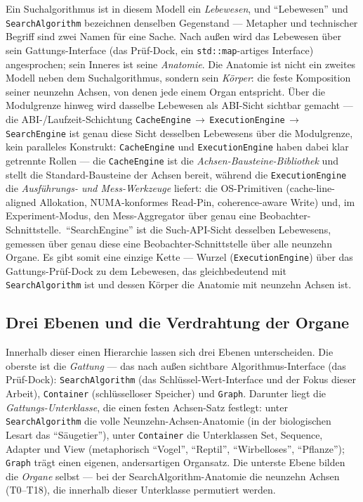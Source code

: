 Ein Suchalgorithmus ist in diesem Modell ein \emph{Lebewesen}, und \enquote{Lebewesen} und
\texttt{SearchAlgorithm} bezeichnen denselben Gegenstand --- Metapher und technischer Begriff sind
zwei Namen für eine Sache. Nach außen wird das Lebewesen über sein Gattungs-Interface (das
Prüf-Dock, ein \texttt{std::map}-artiges Interface) angesprochen; sein Inneres ist seine
\emph{Anatomie}. Die Anatomie ist nicht ein zweites Modell neben dem Suchalgorithmus, sondern sein
\emph{Körper}: die feste Komposition seiner neunzehn Achsen, von denen jede einem Organ
entspricht. Über die Modulgrenze hinweg wird dasselbe Lebewesen als ABI-Sicht sichtbar gemacht ---
die ABI-/Laufzeit-Schichtung
\texttt{CacheEngine}\,$\to$\,\texttt{ExecutionEngine}\,$\to$\,\texttt{SearchEngine} ist genau
diese Sicht desselben Lebewesens über die Modulgrenze, kein paralleles Konstrukt:
\texttt{CacheEngine} und \texttt{ExecutionEngine} haben dabei klar getrennte Rollen --- die
\texttt{CacheEngine} ist die \emph{Achsen-Bausteine-Bibliothek} und stellt die Standard-Bausteine
der Achsen bereit, während die \texttt{ExecutionEngine} die \emph{Ausführungs- und Mess-Werkzeuge}
liefert: die OS-Primitiven (cache-line-aligned Allokation, NUMA-konformes Read-Pin,
coherence-aware Write) und, im Experiment-Modus, den Mess-Aggregator über genau eine
Beobachter-Schnittstelle.\ \enquote{SearchEngine} ist die Such-API-Sicht desselben Lebewesens,
gemessen über genau diese eine Beobachter-Schnittstelle über alle neunzehn Organe. Es gibt somit
eine einzige Kette --- Wurzel (\texttt{ExecutionEngine}) über das Gattungs-Prüf-Dock zu dem
Lebewesen, das gleichbedeutend mit \texttt{SearchAlgorithm} ist und dessen Körper die Anatomie mit
neunzehn Achsen ist.

\subsection{Drei Ebenen und die Verdrahtung der Organe}\label{ssec:three-levels}

Innerhalb dieser einen Hierarchie lassen sich drei Ebenen unterscheiden. Die oberste ist die
\emph{Gattung} --- das nach außen sichtbare Algorithmus-Interface (das Prüf-Dock):
\texttt{SearchAlgorithm} (das Schlüssel-Wert-Interface und der Fokus dieser Arbeit),
\texttt{Container} (schlüsselloser Speicher) und \texttt{Graph}. Darunter liegt die
\emph{Gattungs-Unterklasse}, die einen festen Achsen-Satz festlegt: unter \texttt{SearchAlgorithm} die
volle Neunzehn-Achsen-Anatomie (in der biologischen Lesart das \enquote{Säugetier}), unter
\texttt{Container} die Unterklassen Set, Sequence, Adapter und View (metaphorisch \enquote{Vogel},
\enquote{Reptil}, \enquote{Wirbelloses}, \enquote{Pflanze}); \texttt{Graph} trägt einen eigenen, andersartigen Organsatz. Die unterste Ebene bilden die
\emph{Organe} selbst --- bei der SearchAlgorithm-Anatomie die neunzehn Achsen (T0--T18), die innerhalb dieser Unterklasse permutiert
werden.

